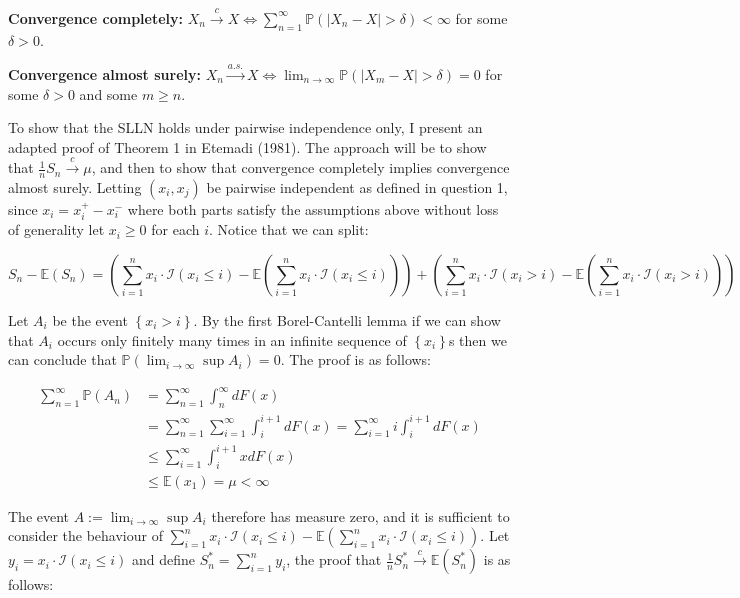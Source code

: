 \documentclass[11pt]{article}\usepackage[utf8]{inputenc}
\begin{document}
\textbf{Convergence completely:} $X_n \xrightarrow{c} X \Leftrightarrow \sum_{n=1}^{\infty} \mathbb{P}(|X_n - X| > \delta ) < \infty $ for some $\delta > 0$. 

\textbf{Convergence almost surely:} $X_n \xrightarrow{a.s.} X \Leftrightarrow \lim_{n \rightarrow \infty} \mathbb{P}(|X_m-X| > \delta)  = 0 $ for some $\delta > 0$ and some $m \geq n$. 

To show that the SLLN holds under pairwise independence only, I present an adapted proof of Theorem 1 in Etemadi (1981). The approach will be to show that $\frac{1}{n}S_n \xrightarrow{c} \mu$, and then to show that convergence completely implies convergence almost surely. Letting $(x_i,x_j)$ be pairwise independent as defined in question 1, since $x_i = x_i^+ - x_i^-$ where both parts satisfy the assumptions above without loss of generality let $x_i \geq 0$ for each $i$. Notice that we can split: 

\begin{equation*}
    S_n - \mathbb{E}(S_n) = \left ( \sum_{i=1}^n x_i \cdot \mathcal{I}(x_i \leq i) - \mathbb{E}(\sum_{i=1}^n x_i \cdot \mathcal{I}(x_i \leq i))  \right ) + \left ( \sum_{i=1}^n x_i \cdot \mathcal{I}(x_i > i) - \mathbb{E}(\sum_{i=1}^n x_i \cdot \mathcal{I}(x_i > i))  \right )
\end{equation*}

Let $A_i$ be the event $\left \{ x_i > i  \right \}$. By the first Borel-Cantelli lemma if we can show that $A_i$ occurs only finitely many times in an infinite sequence of $\left \{ x_i \right \}$s then we can conclude that $\mathbb{P}\left ( \lim_{i \rightarrow \infty} \sup A_i  \right ) = 0$. The proof is as follows: 

\begin{align*}
    \sum_{n=1}^\infty \mathbb{P}(A_n) &= \sum_{n=1}^\infty \int_n^\infty dF(x) \\ 
    &= \sum_{n=1}^\infty \sum_{i=1}^\infty \int_i^{i+1} dF(x) = \sum_{i=1}^\infty i \int_i^{i+1} dF(x) \\
    & \leq \sum_{i=1}^\infty \int_i^{i+1} x dF(x) \\
    & \leq \mathbb{E}(x_1) = \mu < \infty
\end{align*}

The event $A := \lim_{i \rightarrow \infty} \sup A_i$ therefore has measure zero, and it is sufficient to consider the behaviour of $ \sum_{i=1}^n x_i \cdot \mathcal{I}(x_i \leq i) - \mathbb{E}(\sum_{i=1}^n x_i \cdot \mathcal{I}(x_i \leq i))$. Let $y_i = x_i \cdot \mathcal{I}(x_i \leq i)$ and define $S^*_n = \sum_{i=1}^n y_i$, the proof that $\frac{1}{n}S^*_n \xrightarrow{c} \mathbb{E}(S^*_n)$ is as follows: 
\end{document}
